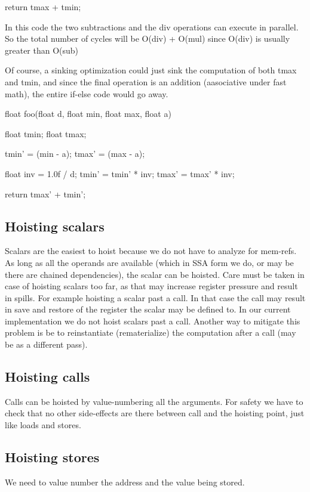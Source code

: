 \begin{section}
\begin{program}
{  return tmax + tmin;
}

\end{program}

In this code the two subtractions and the div operations can execute
in parallel. So the total number of cycles will be O(div) + O(mul)
since O(div) is usually greater than O(sub)

Of course, a sinking optimization could just sink the computation of
both tmax and tmin, and since the final operation is an addition
(aasociative under fast math), the entire if-else code would go away.

\begin{program}
float foo(float d, float min, float max, float a)
{
  float tmin;
  float tmax;

  tmin' = (min - a);
  tmax' = (max - a);

  float inv = 1.0f / d;
  tmin' = tmin' * inv;
  tmax' = tmax' * inv;

  return tmax' + tmin';
}
\end{program}

\section{Hoisting scalars}
Scalars are the easiest to hoist because we do not have to analyze for
mem-refs. As long as all the operands are available (which in SSA form
we do, or may be there are chained dependencies), the scalar can be
hoisted. Care must be taken in case of hoisting scalars too far, as
that may increase register pressure and result in spills. For example
hoisting a scalar past a call. In that case the call may result in
save and restore of the register the scalar may be defined to. In our
current implementation we do not hoist scalars past a call. Another
way to mitigate this problem is be to reinstantiate (rematerialize)
the computation after a call (may be as a different pass).

\section{Hoisting calls}
Calls can be hoisted by value-numbering all the arguments. For safety
we have to check that no other side-effects are there between call and
the hoisting point, just like loads and stores.

\section{Hoisting stores}
We need to value number the address and the value being stored.


\end{section}
